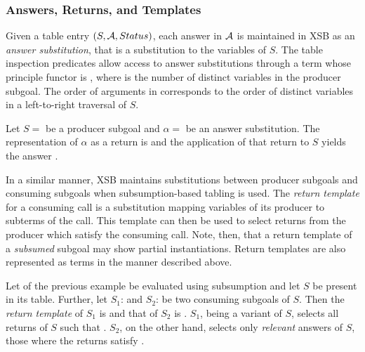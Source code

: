 
\subsubsection*{Answers, Returns, and Templates}

Given a table entry $(S,{\cal A},Status)$, each answer in ${\cal A}$ is
maintained in XSB as an {\em answer substitution}, that is a
substitution to the variables of $S$\@.  The table inspection predicates
allow access to answer substitutions through a term whose principle
functor is \retn, where  is the number of distinct variables
in the producer subgoal.  The order of arguments in \retn{}
corresponds to the order of distinct variables in a left-to-right
traversal of $S$.

\begin{example}
Let $S =$  be a producer subgoal and $\alpha =$
 be an answer substitution.  The representation of
$\alpha$ as a return is  and the application of that
return to $S$ yields the answer .\fillBox
\end{example}

In a similar manner, XSB maintains substitutions between producer
subgoals and consuming subgoals when subsumption-based tabling is
used.  The \emph{return template} for a consuming call is a
substitution mapping variables of its producer to subterms of the
call.  This template can then be used to select returns from the
producer which satisfy the consuming call.  Note, then, that a return
template of a \emph{subsumed} subgoal may show partial instantiations.
Return templates are also represented as \retn{} terms in the manner
described above.

\begin{example}
Let  of the previous example be evaluated using subsumption
and let $S$ be present in its table.  Further, let $S_1$:
 and $S_2$:  be two consuming
subgoals of $S$\@.  Then the \emph{return template} of $S_1$ is
 and that of $S_2$ is .  $S_1$, being
a variant of $S$, selects all returns of $S$ such that
\@.  $S_2$, on the other hand, selects only
\emph{relevant} answers of $S$, those where the returns satisfy
.\fillBox
\end{example}

